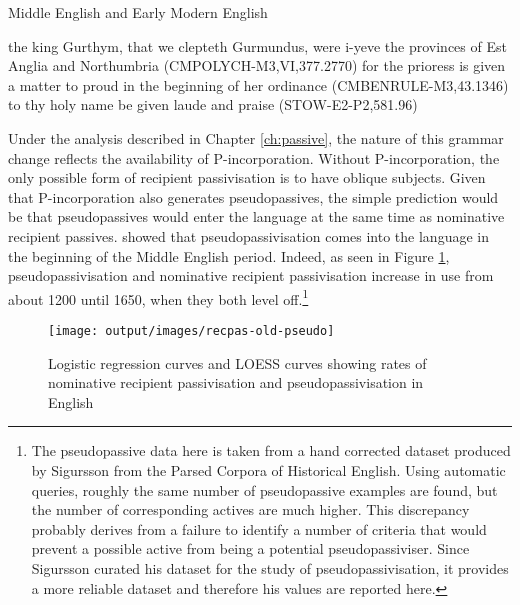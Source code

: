 	\begin{exe}
		\ex Middle English \citep{Kroch.2000} and Early Modern English \citep{Kroch.2004}
		\begin{xlist}
			\ex\label{ex:obliq-rec-eng} the king Gurthym, that we clepteth Gurmundus, were i-yeve the provinces of Est Anglia and Northumbria (CMPOLYCH-M3,VI,377.2770)
			\ex\label{ex:nom-rec-eng} for the prioress is given a matter to proud in the beginning of her ordinance (CMBENRULE-M3,43.1346)
			\ex\label{ex:obliq-to-rec-eng} to thy holy name be given laude and praise (STOW-E2-P2,581.96)
		\end{xlist}
	\end{exe}

	Under the analysis described in Chapter \ref{ch:passive}, the nature of this grammar change reflects the availability of P-incorporation. Without P-incorporation, the only possible form of recipient passivisation is to have oblique subjects. Given that P-incorporation also generates pseudopassives, the simple prediction would be that pseudopassives would enter the language at the same time as nominative recipient passives. \cite{Sigursson.2014} showed that pseudopassivisation comes into the language in the beginning of the Middle English period. Indeed, as seen in Figure \ref{fig:recpas-pseudo}, pseudopassivisation and nominative recipient passivisation increase in use from about 1200 until 1650, when they both level off.\footnote{The pseudopassive data here is taken from a hand corrected dataset produced by Sigursson from the Parsed Corpora of Historical English. Using automatic queries, roughly the same number of pseudopassive examples are found, but the number of corresponding actives are much higher. This discrepancy probably derives from a failure to identify a number of criteria that would prevent a possible active from being a potential pseudopassiviser. Since Sigursson curated his dataset for the study of pseudopassivisation, it provides a more reliable dataset and therefore his values are reported here.}

	\begin{figure}[ht!]
		\texttt{[image: output/images/recpas-old-pseudo]}
		\caption{Logistic regression curves and LOESS curves showing rates of nominative recipient passivisation and pseudopassivisation in English}
		\label{fig:recpas-pseudo}
	\end{figure}

